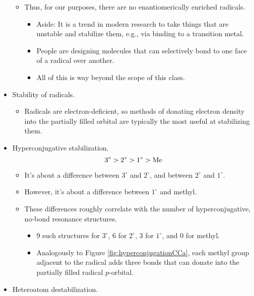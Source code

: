 \documentclass[../notes.tex]{subfiles}
\begin{document}
\begin{itemize}
\begin{itemize}
\begin{itemize}
        \end{itemize}
        \item Thus, for our purposes, there are no enantiomerically enriched radicals.
        \begin{itemize}
            \item Aside: It is a trend in modern research to take things that are unstable and stabilize them, e.g., via binding to a transition metal.
            \item People are designing molecules that can selectively bond to one face of a radical over another.
            \item All of this is way beyond the scope of this class.
        \end{itemize}
    \end{itemize}
    \item Stability of radicals.
    \begin{itemize}
        \item Radicals are electron-deficient, so methods of donating electron density into the partially filled orbital are typically the most useful at stabilizing them.
    \end{itemize}
    \item Hyperconjugative stabilization.
    \begin{equation*}
        3^\circ > 2^\circ > 1^\circ > \ce{Me}
    \end{equation*}
    \begin{itemize}
        \item It's about a  difference between $3^\circ$ and $2^\circ$, and between $2^\circ$ and $1^\circ$.
        \item However, it's about a  difference between $1^\circ$ and methyl.
        \item These differences roughly correlate with the number of hyperconjugative, no-bond resonance structures.
        \begin{itemize}
            \item 9 such structures for $3^\circ$, 6 for $2^\circ$, 3 for $1^\circ$, and 0 for methyl.
            \item Analogously to Figure \ref{fig:hyperconjugationCCa}, each methyl group adjacent to the radical adds three  bonds that can donate into the partially filled radical $p$-orbital.
        \end{itemize}
    \end{itemize}
    \item Heteroatom destabilization.

\end{itemize}
\end{document}
